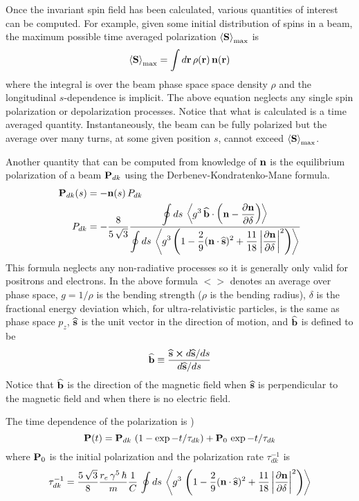 {Once the invariant spin field has been calculated, various quantities of interest can be
computed. For example, given some initial distribution of spins in a beam, the maximum possible time
averaged polarization $\left< {\bf S} \right>_{\max}$ is
\begin{equation}
  \left< {\bf S} \right>_{\max} = \int d{\bf r} \, \rho({\bf r}) \, {\bf n}({\bf r})
\end{equation}
where the integral is over the beam phase space space density $\rho$ and the longitudinal
$s$-dependence is implicit. The above equation neglects any single spin polarization or
depolarization processes. Notice that what is calculated is a time averaged quantity.
Instantaneously, the beam can be fully polarized but the average over many turns, at some given
position $s$, cannot exceed $\left< {\bf S} \right>_{\max}$.

Another quantity that can be computed from knowledge of ${\bf n}$ is the equilibrium polarization of a beam
${\bf P}_{dk}$ using the Derbenev-Kondratenko-Mane formula\cite{b:barber99}.
\begin{align}
  {\bf P}_{dk}(s) &= -{\bf n}(s) \, P_{dk} \\
  P_{dk} &= -\frac{8}{5 \, \sqrt{3}}
  \frac{\displaystyle \oint ds \,\left< g^3 \, \widehat{{\bf b}} \cdot 
    \left( {\bf n} - \frac{\partial {\bf n}}{\partial \delta} \right) \right>}
  {\displaystyle \oint ds \, \left< g^3 \left( 1 - \frac{2}{9} ({\bf n} \cdot \widehat{{\bf s}})^2 + 
    \frac{11}{18} \left| \frac{\partial {\bf n}}{\partial \delta} \right|^2 \right) \right>}
    \nonumber
\end{align}
This formula neglects any non-radiative processes so it is generally only valid for positrons and
electrons.  In the above formula $<>$ denotes an average over phase space, $g = 1/\rho$ is the
bending strength ($\rho$ is the bending radius), $\delta$ is the fractional energy deviation which,
for ultra-relativistic particles, is the same as phase space $p_z$, $\widehat{{\bf s}}$ is the unit vector
in the direction of motion, and $\widehat{{\bf b}}$ is defined to be
\begin{equation}
  \widehat{{\bf b}} \equiv \frac{\widehat{{\bf s}} \mathbin{\boldsymbol{\times}} d\widehat{{\bf s}}/ds}{d\widehat{{\bf s}}/ds}
\end{equation}
Notice that $\widehat{{\bf b}}$ is the direction of the magnetic field when $\widehat{{\bf s}}$ is perpendicular to
the magnetic field and when there is no electric field.

The time dependence of the polarization is \cite{b:barber99})
\begin{equation}
  {\bf P}(t) = {\bf P}_{dk} \, \left( 1 - \exp{-t/\tau_{dk}} \right) + {\bf P}_0 \, \exp{-t/\tau_{dk}}
\end{equation}
where ${\bf P}_0$ is the initial polarization and the polarization rate $\tau_{dk}^{-1}$ is 
\begin{equation}
  \tau_{dk}^{-1} = \frac{5 \, \sqrt{3}}{8} \frac{r_e \, \gamma^5 \, \hbar}{m}
  \frac{1}{C} \, \oint ds \, \left< g^3 \, \left( 1 - \frac{2}{9} ({\bf n} \cdot \widehat{{\bf s}})^2 + 
  \frac{11}{18} \left| \frac{\partial {\bf n}}{\partial \delta} \right|^2 \right) \right>
  \label{t583}
\end{equation}

}
